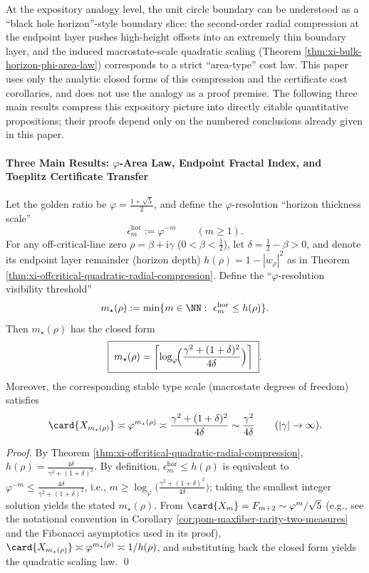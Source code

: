 At the expository analogy level, the unit circle boundary can be understood as a ``black hole horizon''-style boundary slice: the second-order radial compression at the endpoint layer pushes high-height offsets into an extremely thin boundary layer, and the induced macrostate-scale quadratic scaling (Theorem \ref{thm:xi-bulk-horizon-phi-area-law}) corresponds to a strict ``area-type'' cost law.
This paper uses only the analytic closed forms of this compression and the certificate cost corollaries, and does not use the analogy as a proof premise.
The following three main results compress this expository picture into directly citable quantitative propositions; their proofs depend only on the numbered conclusions already given in this paper.

\paragraph{Three Main Results: \texorpdfstring{$\varphi$}{phi}-Area Law, Endpoint Fractal Index, and Toeplitz Certificate Transfer}
\begin{theorem}\label{thm:xi-bulk-horizon-phi-area-law}
Let the golden ratio be \(\varphi=\frac{1+\sqrt5}{2}\), and define the \(\varphi\)-resolution ``horizon thickness scale''
\[
\epsilon_m^{\mathrm{hor}}:=\varphi^{-m}\qquad(m\ge 1).
\]
For any off-critical-line zero \(\rho=\beta+\mathrm{i}\gamma\) (\(0<\beta<\tfrac12\)), let \(\delta=\tfrac12-\beta>0\), and denote its endpoint layer remainder (horizon depth)
\(
h(\rho)=1-|w_\rho|^2
\)
as in Theorem \ref{thm:xi-offcritical-quadratic-radial-compression}.
Define the ``\(\varphi\)-resolution visibility threshold''
\[
m_\star(\rho):=\min\{m\in\NN:\ \epsilon_m^{\mathrm{hor}}\le h(\rho)\}.
\]
Then \(m_\star(\rho)\) has the closed form
\[
\boxed{\;
m_\star(\rho)=\left\lceil \log_{\varphi}\!\Bigl(\frac{\gamma^2+(1+\delta)^2}{4\delta}\Bigr)\right\rceil\; }.
\]
Moreover, the corresponding stable type scale (macrostate degrees of freedom) satisfies
\[
\card{X_{m_\star(\rho)}}\asymp \varphi^{m_\star(\rho)}
\asymp \frac{\gamma^2+(1+\delta)^2}{4\delta}
\sim \frac{\gamma^2}{4\delta}\qquad(|\gamma|\to\infty).
\]
\end{theorem}
\begin{proof}
By Theorem \ref{thm:xi-offcritical-quadratic-radial-compression},
\(
h(\rho)=\frac{4\delta}{\gamma^2+(1+\delta)^2}
\).
By definition, \(\epsilon_m^{\mathrm{hor}}\le h(\rho)\) is equivalent to
\(
\varphi^{-m}\le \frac{4\delta}{\gamma^2+(1+\delta)^2}
\),
i.e.,
\(
m\ge \log_{\varphi}\!\bigl(\frac{\gamma^2+(1+\delta)^2}{4\delta}\bigr)
\);
taking the smallest integer solution yields the stated \(m_\star(\rho)\).
From \(\card{X_m}=F_{m+2}\sim \varphi^m/\sqrt5\) (e.g., see the notational convention in Corollary \ref{cor:pom-maxfiber-rarity-two-measures} and the Fibonacci asymptotics used in its proof),
\(\card{X_{m_\star(\rho)}}\asymp \varphi^{m_\star(\rho)}\asymp 1/h(\rho)\), and substituting back the closed form yields the quadratic scaling law. \qed
\end{proof}

